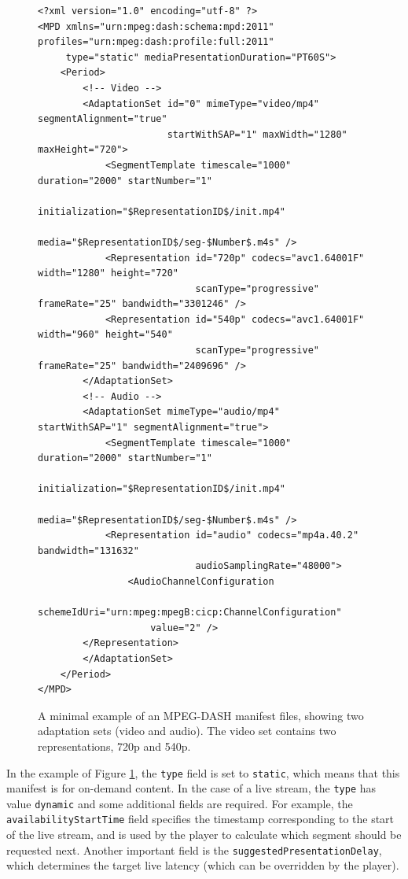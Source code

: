 \begin{figure}[h]
    \centering
    \begin{verbatim}
<?xml version="1.0" encoding="utf-8" ?>
<MPD xmlns="urn:mpeg:dash:schema:mpd:2011" profiles="urn:mpeg:dash:profile:full:2011"
     type="static" mediaPresentationDuration="PT60S">
    <Period>
        <!-- Video -->
        <AdaptationSet id="0" mimeType="video/mp4" segmentAlignment="true"
                       startWithSAP="1" maxWidth="1280" maxHeight="720">
            <SegmentTemplate timescale="1000" duration="2000" startNumber="1"
                             initialization="$RepresentationID$/init.mp4"
                             media="$RepresentationID$/seg-$Number$.m4s" />
            <Representation id="720p" codecs="avc1.64001F" width="1280" height="720"
                            scanType="progressive" frameRate="25" bandwidth="3301246" />
            <Representation id="540p" codecs="avc1.64001F" width="960" height="540"
                            scanType="progressive" frameRate="25" bandwidth="2409696" />
        </AdaptationSet>
        <!-- Audio -->
        <AdaptationSet mimeType="audio/mp4" startWithSAP="1" segmentAlignment="true">
            <SegmentTemplate timescale="1000" duration="2000" startNumber="1"
                             initialization="$RepresentationID$/init.mp4"
                             media="$RepresentationID$/seg-$Number$.m4s" />
            <Representation id="audio" codecs="mp4a.40.2" bandwidth="131632"
                            audioSamplingRate="48000">
                <AudioChannelConfiguration
                    schemeIdUri="urn:mpeg:mpegB:cicp:ChannelConfiguration"
                    value="2" />
        </Representation>
        </AdaptationSet>
    </Period>
</MPD>
    \end{verbatim}
    \caption{A minimal example of an MPEG-DASH manifest files, showing two adaptation sets (video and audio). The video set contains two representations, 720p and 540p.}
    \label{fig:dash_manifest}
\end{figure}

In the example of Figure \ref{fig:dash_manifest}, the \texttt{type} field is set to \texttt{static}, which means that this manifest is for on-demand content. In the case of a live stream, the \texttt{type} has value \texttt{dynamic} and some additional fields are required. For example, the \texttt{availabilityStartTime} field specifies the timestamp corresponding to the start of the live stream, and is used by the player to calculate which segment should be requested next. Another important field is the \texttt{suggestedPresentationDelay}, which determines the target live latency (which can be overridden by the player).


